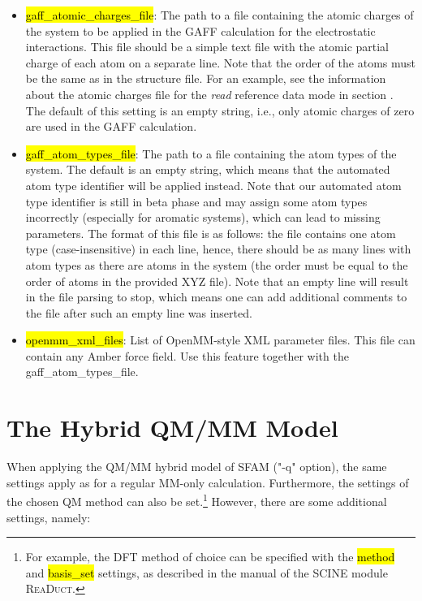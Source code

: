 \documentclass[]{tufte-book}
\begin{document}
{{\begin{itemize}
\item \hl{gaff\_atomic\_charges\_file}: The path to a file containing the atomic charges of the system to be applied in the GAFF calculation for the electrostatic interactions. This file should be a simple text file with the atomic partial charge of each atom on a separate line. Note that the order of the atoms must be the same as in the structure file. For an example, see the information about the atomic charges file for the \textit{read} reference data mode in section . The default of this setting is an empty string, i.e., only atomic charges of zero are used in the GAFF calculation.
\item \hl{gaff\_atom\_types\_file}: The path to a file containing the atom types of the system. The default is an empty string, which means that the automated atom type identifier will be applied instead. Note that our automated atom type identifier is still in beta phase and may assign some atom types incorrectly (especially for aromatic systems), which can lead to missing parameters. The format of this file is as follows: the file contains one atom type (case-insensitive) in each line, hence, there should be as many lines with atom types as there are atoms in the system (the order must be equal to the order of atoms in the provided XYZ file). Note that an empty line will result in the file parsing to stop, which means one can add additional comments to the file after such an empty line was inserted.
\item \hl{openmm\_xml\_files}: List of OpenMM-style XML parameter files. This file can contain any Amber force field. Use this feature together with the gaff\_atom\_types\_file.
\end{itemize}


\chapter{The Hybrid QM/MM Model}\label{ch:qmmm}
\label{sec:qm_mm}

When applying the QM/MM hybrid model of SFAM ("-q" option), the same settings apply as for a regular MM-only calculation. Furthermore, the settings of the chosen QM method can also be set.\footnote{For example, the DFT method of choice can be specified with the \hl{method} and \hl{basis\_set} settings, as described in the manual of the SCINE module \textsc{ReaDuct}.} However, there are some additional settings, namely:

}}
\end{document}
